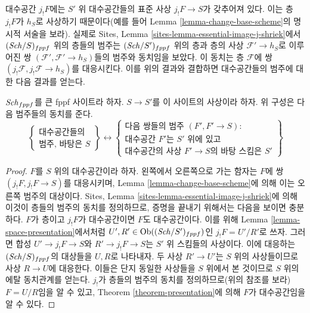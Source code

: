 \noindent
대수공간 $j_!F$에는 $S'$ 위 대수공간들의 표준 사상
$j_!F \to S$가 갖추어져 있다. 이는 층 $j_!F$가 $h_S$로
사상하기 때문이다(예를 들어 Lemma
\ref{lemma-change-base-scheme}의 명시적 서술을 보라).
실제로 Sites, Lemma \ref{sites-lemma-essential-image-j-shriek}에서
$(\mathit{Sch}/S)_{fppf}$ 위의 층들의 범주는 $(\mathit{Sch}/S')_{fppf}$ 위의 층과
층의 사상 $\mathcal{F}' \to h_S$로 이루어진 쌍
$(\mathcal{F}', \mathcal{F}' \to h_S)$들의 범주와 동치임을
보았다. 이 동치는 층 $\mathcal{F}$에 쌍
$(j_!\mathcal{F}, j_!\mathcal{F} \to h_S)$를 대응시킨다.
이를 위의 결과와 결합하면 대수공간들의 범주에 대한 다음 결과를
얻는다.

\begin{lemma}
\label{lemma-category-of-spaces-over-smaller-base-scheme}
$\mathit{Sch}_{fppf}$를 큰 fppf 사이트라 하자.
$S \to S'$를 이 사이트의 사상이라 하자.
위 구성은 다음 범주들의 동치를 준다.
$$
\left\{
\begin{matrix}
\text{대수공간들의}\\
\text{범주, 바탕은 }S
\end{matrix}
\right\}
\leftrightarrow
\left\{
\begin{matrix}
\text{다음 쌍들의 범주 }(F', F' \to S)\text{:}\\
\text{대수공간 }F'\text{는 }S'\text{ 위에 있고}\\
\text{대수공간의 사상 }F' \to S\text{의 바탕 스킴은 }S'
\end{matrix}
\right\}
$$
\end{lemma}

\begin{proof}
$F$를 $S$ 위의 대수공간이라 하자. 왼쪽에서 오른쪽으로 가는
함자는 $F$에 쌍 $(j_!F, j_!F \to S)$를 대응시키며, Lemma
\ref{lemma-change-base-scheme}에 의해 이는 오른쪽 범주의
대상이다.
Sites, Lemma \ref{sites-lemma-essential-image-j-shriek}에 의해
이것이 층들의 범주의 동치를 정의하므로, 증명을 끝내기 위해서는
다음을 보이면 충분하다. $F$가 층이고 $j_!F$가 대수공간이면
$F$도 대수공간이다. 이를 위해 Lemma
\ref{lemma-space-presentation}에서처럼
$U', R' \in \mathop{\mathrm{Ob}}\nolimits((\mathit{Sch}/S')_{fppf})$인
$j_!F = U'/R'$로 쓰자.
그러면 합성 $U' \to j_!F \to S$와 $R' \to j_!F \to S$는
$S'$ 위 스킴들의 사상이다. 이에 대응하는 $(\mathit{Sch}/S)_{fppf}$의
대상들을 $U, R$로 나타내자. 두 사상 $R' \to U'$는 $S$ 위의
사상들이므로 사상 $R \to U$에 대응한다. 이들은 단지 동일한
사상들을 $S$ 위에서 본 것이므로 $S$ 위의 에탈 동치관계를 얻는다.
$j_!$가 층들의 범주의 동치를 정의하므로(위의 참조를 보라)
$F = U/R$임을 알 수 있고, Theorem \ref{theorem-presentation}에
의해 $F$가 대수공간임을 알 수 있다.
\end{proof}

